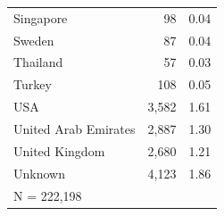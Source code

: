 \begin{tabular}{lrr}
Singapore           &          98&        0.04\\
Sweden              &          87&        0.04\\
Thailand            &          57&        0.03\\
Turkey              &         108&        0.05\\
USA                 &       3,582&        1.61\\
United Arab Emirates&       2,887&        1.30\\
United Kingdom      &       2,680&        1.21\\
Unknown             &       4,123&        1.86\\
\midrule


\multicolumn{3}{l}{\footnotesize N =      222,198}\\


\bottomrule


\end{tabular}


